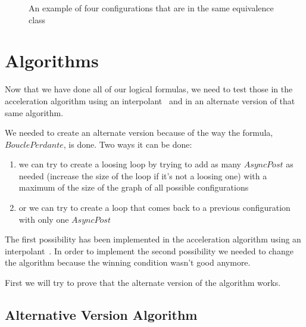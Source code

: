 \documentclass{article}
\begin{document}
\begin{figure}[!h]
    \centering
    \def\svgscale{0.8}
    
    \caption{An example of four configurations that are in the same equivalence class}
    \label{dessinEqui}
\end{figure}

\section{Algorithms}

Now that we have done all of our logical formulas, we need to test those in the acceleration algorithm using an interpolant~\cite{algo} and in an alternate version of that same algorithm.

We needed to create an alternate version because of the way the formula, $BouclePerdante$, is done. Two ways it can be done:
\begin{enumerate}
    \item we can try to create a loosing loop by trying to add as many $AsyncPost$ as needed  (increase the size of the loop if it's not a loosing one) with a maximum of the size of the graph of all possible configurations
    \item or we can try to create a loop that comes back to a previous configuration with only one $AsyncPost$
\end{enumerate}

The first possibility has been implemented in the acceleration algorithm using an interpolant~\cite{algo}. In order to implement the second possibility we needed to change the algorithm because the winning condition wasn't good anymore.

First we will try to prove that the alternate version of the algorithm works.

\subsection{Alternative Version Algorithm}
\end{document}
